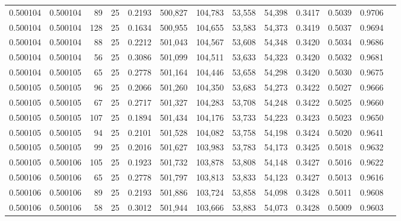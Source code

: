 \begin{tabular}{rrrrrrrrrrrrr}
0.500104 & 0.500104 &    89 &  25 &                                     0.2193 & 500,827 & 104,783 &  53,558 &  54,398 & 0.3417 & 0.5039 & 0.9706 \\
0.500104 & 0.500104 &   128 &  25 &                                     0.1634 & 500,955 & 104,655 &  53,583 &  54,373 & 0.3419 & 0.5037 & 0.9694 \\
0.500104 & 0.500104 &    88 &  25 &                                     0.2212 & 501,043 & 104,567 &  53,608 &  54,348 & 0.3420 & 0.5034 & 0.9686 \\
0.500104 & 0.500104 &    56 &  25 &                                     0.3086 & 501,099 & 104,511 &  53,633 &  54,323 & 0.3420 & 0.5032 & 0.9681 \\
0.500104 & 0.500105 &    65 &  25 &                                     0.2778 & 501,164 & 104,446 &  53,658 &  54,298 & 0.3420 & 0.5030 & 0.9675 \\
0.500105 & 0.500105 &    96 &  25 &                                     0.2066 & 501,260 & 104,350 &  53,683 &  54,273 & 0.3422 & 0.5027 & 0.9666 \\
0.500105 & 0.500105 &    67 &  25 &                                     0.2717 & 501,327 & 104,283 &  53,708 &  54,248 & 0.3422 & 0.5025 & 0.9660 \\
0.500105 & 0.500105 &   107 &  25 &                                     0.1894 & 501,434 & 104,176 &  53,733 &  54,223 & 0.3423 & 0.5023 & 0.9650 \\
0.500105 & 0.500105 &    94 &  25 &                                     0.2101 & 501,528 & 104,082 &  53,758 &  54,198 & 0.3424 & 0.5020 & 0.9641 \\
0.500105 & 0.500105 &    99 &  25 &                                     0.2016 & 501,627 & 103,983 &  53,783 &  54,173 & 0.3425 & 0.5018 & 0.9632 \\
0.500105 & 0.500106 &   105 &  25 &                                     0.1923 & 501,732 & 103,878 &  53,808 &  54,148 & 0.3427 & 0.5016 & 0.9622 \\
0.500106 & 0.500106 &    65 &  25 &                                     0.2778 & 501,797 & 103,813 &  53,833 &  54,123 & 0.3427 & 0.5013 & 0.9616 \\
0.500106 & 0.500106 &    89 &  25 &                                     0.2193 & 501,886 & 103,724 &  53,858 &  54,098 & 0.3428 & 0.5011 & 0.9608 \\
0.500106 & 0.500106 &    58 &  25 &                                     0.3012 & 501,944 & 103,666 &  53,883 &  54,073 & 0.3428 & 0.5009 & 0.9603 \\

\end{tabular}
